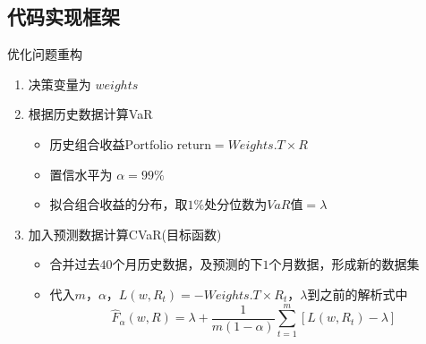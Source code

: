 \documentclass[CJK,aspectratio=43]{beamer}  %
\begin{document}
\subsection{代码实现框架}
\begin{frame}{优化问题重构}
	\begin{enumerate}
		\item 决策变量为 $weights$
		\item 根据历史数据计算VaR
		\begin{itemize}
			\item 历史组合收益$ \text{Portfolio return} = Weights.T \times R $
			\item 置信水平为 $\alpha=99\%$
			\item 拟合组合收益的分布，取$1\%$处分位数为$VaR$值$=\lambda$
		\end{itemize}
		\item 加入预测数据计算CVaR(目标函数)
		\begin{itemize}
			\item 合并过去$40$个月历史数据，及预测的下$1$个月数据，形成新的数据集
			\item 代入$m$，$\alpha$，$L(w,R_t)=-Weights.T \times R_t$，$\lambda$到之前的解析式中
			$$
			\widehat{F}_{\alpha}(w,R)=\lambda+\frac{1}{m(1-\alpha)}\sum_{t=1}^{m}[L(w,R_t)-\lambda]
			$$
		\end{itemize}
	\end{enumerate}
\end{frame}
\end{document}
